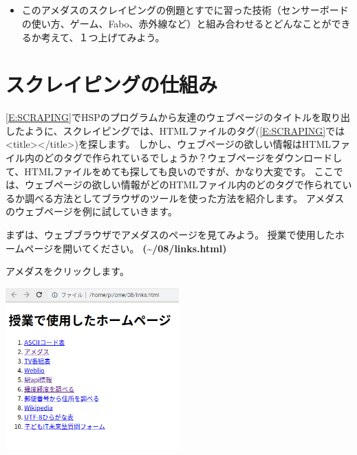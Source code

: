 \bigskip


\bigskip

\subsection*{\theQuestion\label{Q:amedas3}}
\begin{itemize}
\item
このアメダスのスクレイピングの例題とすでに習った技術（センサーボードの使い方、ゲーム、Fabo、赤外線など）と組み合わせるとどんなことができるか考えて、１つ上げてみよう。
\end{itemize}

\bigskip


\bigskip

\clearpage\section{スクレイピングの仕組み}
\ref*{E:SCRAPING}でHSPのプログラムから友達のウェブページのタイトルを取り出したように、スクレイピングでは、HTMLファイルのタグ(\ref*{E:SCRAPING}では{\textless}title{\textgreater}{\textless}/title{\textgreater})を探します。
しかし、ウェブページの欲しい情報はHTMLファイル内のどのタグで作られているでしょうか？ウェブページをダウンロードして、HTMLファイルをめても探しても良いのですが、かなり大変です。
ここでは、ウェブページの欲しい情報がどのHTMLファイル内のどのタグで作られているか調べる方法としてブラウザのツールを使った方法を紹介します。
アメダスのウェブページを例に試していきます。

\bigskip

まずは、ウェブブラウザでアメダスのページを見てみよう。
授業で使用したホームページを開いてください。
\textbf{({\textasciitilde}/08/links.html)}

アメダスをクリックします。



\begin{center}
\includegraphics[width=0.5\textwidth]{./text08-img/textbook-img017.png}

\end{center}


